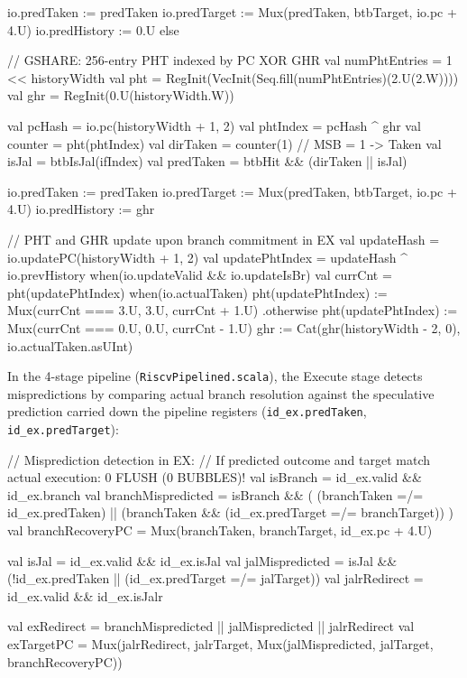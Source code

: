 \begin{chiselcode}[caption={Chisel implementation of the parameterized Branch Predictor supporting Static BTFN and Dynamic Gshare (scabook/riscv/BranchPredictor.scala).}, label={lst:branch_predictor_chisel}]
{{{      io.predTaken   := predTaken
      io.predTarget  := Mux(predTaken, btbTarget, io.pc + 4.U)
      io.predHistory := 0.U
    } else {
      // GSHARE: 256-entry PHT indexed by PC XOR GHR
      val numPhtEntries = 1 << historyWidth
      val pht = RegInit(VecInit(Seq.fill(numPhtEntries)(2.U(2.W))))
      val ghr = RegInit(0.U(historyWidth.W))

      val pcHash    = io.pc(historyWidth + 1, 2)
      val phtIndex  = pcHash ^ ghr
      val counter   = pht(phtIndex)
      val dirTaken  = counter(1) // MSB = 1 -> Taken
      val isJal     = btbIsJal(ifIndex)
      val predTaken = btbHit && (dirTaken || isJal)

      io.predTaken   := predTaken
      io.predTarget  := Mux(predTaken, btbTarget, io.pc + 4.U)
      io.predHistory := ghr

      // PHT and GHR update upon branch commitment in EX
      val updateHash     = io.updatePC(historyWidth + 1, 2)
      val updatePhtIndex = updateHash ^ io.prevHistory
      when(io.updateValid && io.updateIsBr) {
        val currCnt = pht(updatePhtIndex)
        when(io.actualTaken) {
          pht(updatePhtIndex) := Mux(currCnt === 3.U, 3.U, currCnt + 1.U)
        }.otherwise {
          pht(updatePhtIndex) := Mux(currCnt === 0.U, 0.U, currCnt - 1.U)
        }
        ghr := Cat(ghr(historyWidth - 2, 0), io.actualTaken.asUInt)
      }
    }
  }
}
\end{chiselcode}

In the 4-stage pipeline (\texttt{RiscvPipelined.scala}), the Execute stage detects mispredictions by comparing actual branch resolution against the speculative prediction carried down the pipeline registers (\texttt{id\_ex.predTaken}, \texttt{id\_ex.predTarget}):
\begin{chiselcode}[caption={Misprediction detection and recovery logic in the Execute stage (scabook/riscv/RiscvPipelined.scala).}, label={lst:riscv_mispredict_chisel}]
  // Misprediction detection in EX:
  // If predicted outcome and target match actual execution: 0 FLUSH (0 BUBBLES)!
  val isBranch = id_ex.valid && id_ex.branch
  val branchMispredicted = isBranch && (
    (branchTaken =/= id_ex.predTaken) ||
    (branchTaken && (id_ex.predTarget =/= branchTarget))
  )
  val branchRecoveryPC = Mux(branchTaken, branchTarget, id_ex.pc + 4.U)

  val isJal = id_ex.valid && id_ex.isJal
  val jalMispredicted = isJal && (!id_ex.predTaken || (id_ex.predTarget =/= jalTarget))
  val jalrRedirect = id_ex.valid && id_ex.isJalr

  val exRedirect = branchMispredicted || jalMispredicted || jalrRedirect
  val exTargetPC = Mux(jalrRedirect, jalrTarget,
                   Mux(jalMispredicted, jalTarget,
                       branchRecoveryPC))
\end{chiselcode}

